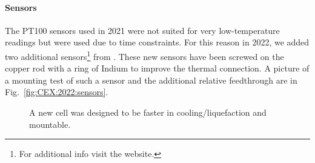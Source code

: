 \begin{refsection}
        \paragraph{Sensors} The PT100 sensors used in 2021 were not suited for very low-temperature readings but were used due to time constraints. 
        For this reason in 2022, we added two additional sensors\footnote{For additional info visit the \href{https://www.lakeshore.com/products/categories/overview/temperature-products/cryogenic-temperature-sensors/germanium}{\underline{\lakeshore}} website.} from \lakeshore.
        These new sensors have been screwed on the copper rod with a ring of Indium to improve the thermal connection. 
        A picture of a mounting test of such a sensor and the additional relative feedthrough are in Fig.~\ref{fig:CEX:2022:sensors}.

        \begin{figure}
            \centering
            \hfill
            \caption[CEX 2022: New cell design]{A new cell was designed to be faster in cooling/liquefaction and mountable.}
            \label{fig:CEX:2022:cell}
        \end{figure}
        

\end{refsection}
